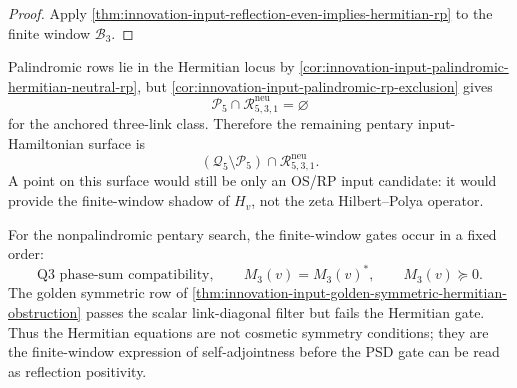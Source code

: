 \begin{proof}
Apply
\autoref{thm:innovation-input-reflection-even-implies-hermitian-rp} to
the finite window $\mathcal B_3$.
\end{proof}

\begin{principle}
\label{prin:innovation-input-nonpalindromic-feasibility-surface}
Palindromic rows lie in the Hermitian locus by
\autoref{cor:innovation-input-palindromic-hermitian-neutral-rp}, but
\autoref{cor:innovation-input-palindromic-rp-exclusion} gives
$$
\mathcal P_5\cap\mathcal R_{5,3,1}^{\mathrm{neu}}=\varnothing
$$
for the anchored three-link class. Therefore the remaining pentary
input-Hamiltonian surface is
$$
(\mathcal Q_5\setminus\mathcal P_5)
\cap
\mathcal R_{5,3,1}^{\mathrm{neu}}.
$$
A point on this surface would still be only an OS/RP input candidate: it
would provide the finite-window shadow of $H_v$, not the zeta
Hilbert--Polya operator.
\end{principle}

\begin{principle}
\label{prin:innovation-input-hermitian-before-positivity}
For the nonpalindromic pentary search, the finite-window gates occur in a
fixed order:
$$
\text{Q3 phase-sum compatibility},
\qquad
M_3(v)=M_3(v)^*,
\qquad
M_3(v)\succeq0.
$$
The golden symmetric row of
\autoref{thm:innovation-input-golden-symmetric-hermitian-obstruction}
passes the scalar link-diagonal filter but fails the Hermitian gate. Thus
the Hermitian equations are not cosmetic symmetry conditions; they are the
finite-window expression of self-adjointness before the PSD gate can be
read as reflection positivity.
\end{principle}
